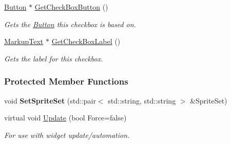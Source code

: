 \begin{DoxyCompactItemize}
\hyperlink{classphys_1_1UI_1_1Button}{Button} $\ast$ \hyperlink{classphys_1_1UI_1_1CheckBox_a728de15a5c8e512fd3fbb2b8a3f808ee}{GetCheckBoxButton} ()
\begin{DoxyCompactList}\small\item\em Gets the \hyperlink{classphys_1_1UI_1_1Button}{Button} this checkbox is based on. \item\end{DoxyCompactList}\item 
\hyperlink{classphys_1_1UI_1_1MarkupText}{MarkupText} $\ast$ \hyperlink{classphys_1_1UI_1_1CheckBox_a5f37379e69ef1259ab48c37a8dc200e9}{GetCheckBoxLabel} ()
\begin{DoxyCompactList}\small\item\em Gets the label for this checkbox. \item\end{DoxyCompactList}\end{DoxyCompactItemize}
\subsubsection*{Protected Member Functions}
\begin{DoxyCompactItemize}
\item 
\hypertarget{classphys_1_1UI_1_1CheckBox_ac20138946e42c608ac0808fc40fce4ce}{
void {\bfseries SetSpriteSet} (std::pair$<$ std::string, std::string $>$ \&SpriteSet)}
\label{dd/d10/classphys_1_1UI_1_1CheckBox_ac20138946e42c608ac0808fc40fce4ce}

\item 
\hypertarget{classphys_1_1UI_1_1CheckBox_ad988ce71809fd1dea6def42da50232eb}{
virtual void \hyperlink{classphys_1_1UI_1_1CheckBox_ad988ce71809fd1dea6def42da50232eb}{Update} (bool Force=false)}
\label{dd/d10/classphys_1_1UI_1_1CheckBox_ad988ce71809fd1dea6def42da50232eb}

\begin{DoxyCompactList}\small\item\em For use with widget update/automation. \item\end{DoxyCompactList}\end{DoxyCompactItemize}
